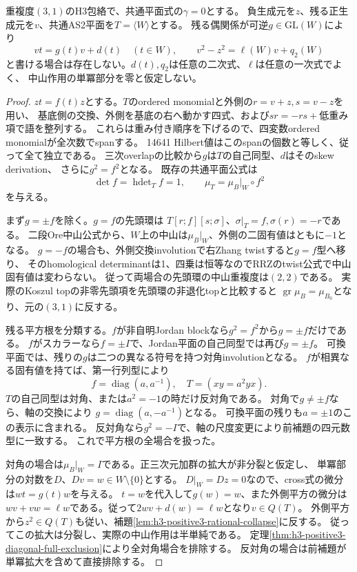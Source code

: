 \begin{theorem}\label{thm:h3-positive3-full-normalizing-chart}
重複度$(3,1)$のH3包絡で、共通平面式の$\gamma=0$とする。
負生成元を$z$、残る正生成元を$v$、共通AS2平面を$T=\langle W\rangle$とする。
残る偶関係が可逆$g\in\mathrm{GL}(W)$により
\[
 vt=g(t)v+d(t)\quad(t\in W),\qquad
 v^2-z^2=\ell(W)v+q_2(W)
\]
と書ける場合は存在しない。$d(t),q_2$は任意の二次式、$\ell$は任意の一次式でよく、
中山作用の単冪部分を零と仮定しない。
\end{theorem}
\begin{proof}
$zt=f(t)z$とする。$T$のordered monomialと外側の$r=v+z,s=v-z$を用い、
基底側の交換、外側を基底の右へ動かす四式、および$sr=-rs+$低重み項で語を整列する。
これらは重み付き順序を下げるので、四変数ordered monomialが全次数でspanする。
14641 Hilbert値はこのspanの個数と等しく、従って全て独立である。
三次overlapの比較から$g$は$T$の自己同型、$d$はそのskew derivation、
さらに$g^2=f^2$となる。
既存の共通平面公式は
\[
 \det f=\operatorname{hdet}_T f=1,\qquad
 \mu_T=\mu_B|_W\circ f^2
\]
を与える。

まず$g=\pm f$を除く。$g=f$の先頭環は
$T[r;f][s;\sigma]$、$\sigma|_T=f,\sigma(r)=-r$である。
二段Ore中山公式から、$W$上の中山は$\mu_B|_W$、外側の二固有値はともに$-1$となる。
$g=-f$の場合も、外側交換involutionで右Zhang twistすると$g=f$型へ移り、
そのhomological determinantは1、四乗は恒等なのでRRZのtwist公式で中山固有値は変わらない。
従って両場合の先頭環の中山重複度は$(2,2)$である。
実際のKoszul topの非零先頭項を先頭環の非退化topと比較すると
$\operatorname{gr}\mu_B=\mu_{B_0}$となり、元の$(3,1)$に反する。

残る平方根を分類する。$f$が非自明Jordan blockなら$g^2=f^2$から$g=\pm f$だけである。
$f$がスカラーなら$f=\pm I$で、Jordan平面の自己同型では再び$g=\pm f$。
可換平面では、残りの$g$は二つの異なる符号を持つ対角involutionとなる。
$f$が相異なる固有値を持てば、第一行列型により
\[
 f=\operatorname{diag}(a,a^{-1}),\quad T=(xy=a^2yx).
\]
$T$の自己同型は対角、または$a^2=-1$の時だけ反対角である。
対角で$g\ne\pm f$なら、軸の交換により
$g=\operatorname{diag}(a,-a^{-1})$となる。
可換平面の残りも$a=\pm1$のこの表示に含まれる。
反対角なら$g^2=-I$で、軸の尺度変更により前補題の四元数型に一致する。
これで平方根の全場合を扱った。

対角の場合は$\mu_B|_W=I$である。正三次元加群の拡大が非分裂と仮定し、
単冪部分の対数を$D$、$Dv=w\in W\setminus\{0\}$とする。
$D|_W=Dz=0$なので、cross式の微分は$wt=g(t)w$を与える。
$t=w$を代入して$g(w)=w$、また外側平方の微分は
$wv+vw=\ell w$である。従って$2wv+d(w)=\ell w$となり$v\in Q(T)$。
外側平方から$z^2\in Q(T)$も従い、補題\ref{lem:h3-positive3-rational-collapse}に反する。
従ってこの拡大は分裂し、実際の中山作用は半単純である。
定理\ref{thm:h3-positive3-diagonal-full-exclusion}により全対角場合を排除する。
反対角の場合は前補題が単冪拡大を含めて直接排除する。
\end{proof}

